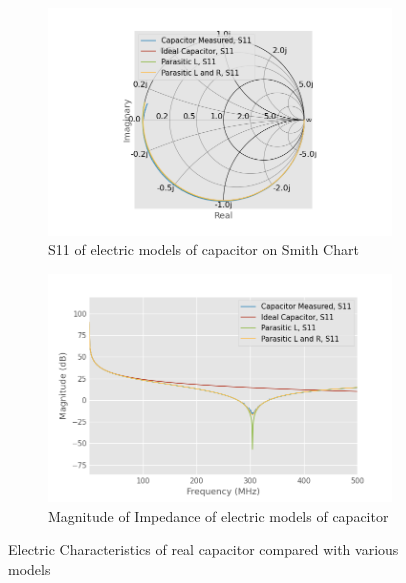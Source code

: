 \documentclass{article}
\begin{document}
\begin{figure}
    \centering
    \begin{subfigure}{\linewidth}
        \centering
        \includegraphics[width=\linewidth]{./pics/capacitor_models_smith.png}
        \caption{S11 of electric models of capacitor on Smith Chart}
        \label{fig:capacitor_compare_s}
    \end{subfigure}

    \begin{subfigure}{\linewidth}
        \centering
        \includegraphics[width=\linewidth]{./pics/capacitor_models_db.png}
        \caption{Magnitude of Impedance of electric models of capacitor}
        \label{fig:capacitor_compare_z}
    \end{subfigure}
    \caption{Electric Characteristics of real capacitor compared with various models}
    \label{fig:capacitor_compare}
\end{figure}
\end{document}
